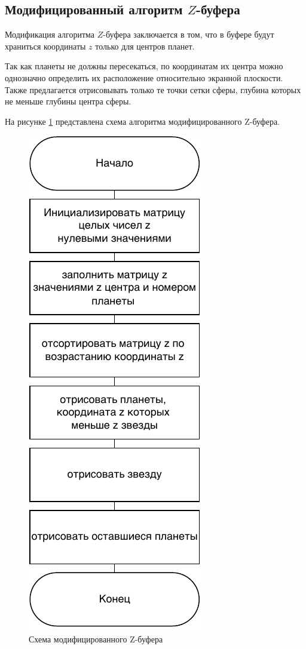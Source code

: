     \subsection{Модифицированный алгоритм $Z$-буфера}
    \par Модификация алгоритма $Z$-буфера заключается в том, что в буфере будут храниться координаты $z$ только для центров планет.
    \par Так как планеты не должны пересекаться, по координатам их центра можно однозначно определить их расположение относительно экранной плоскости. Также предлагается отрисовывать только те точки сетки сферы, глубина которых не меньше глубины центра сферы.
    \par На рисунке \ref{schema:Z_alg_1} представлена схема алгоритма модифицированного Z-буфера.
    \begin{figure}[h!]
            \centering
            \includegraphics[scale=0.8]{inc/Z.pdf}
            \caption{Схема модифицированного Z-буфера}
            \label{schema:Z_alg_1}
    \end{figure}\clearpage

